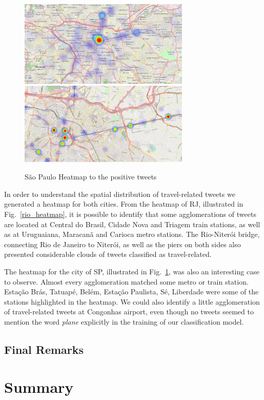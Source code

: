 \begin{figure}[h]
  \caption{São Paulo Heatmap to the positive tweets}
  \centering
    \includegraphics[width=0.725\textwidth]{figures/sp_1}
    \label{sp_heatmap}
\end{figure}

In order to understand the spatial distribution of travel-related tweets we generated a heatmap for both cities. From the heatmap of RJ, illustrated in Fig.~\ref{rio_heatmap}, it is possible to identify that some agglomerations of tweets are located at Central do Brasil, Cidade Nova and Triagem train stations, as well as at Uruguaiana, Maracanã and Carioca metro stations. The Rio-Niterói bridge, connecting Rio de Janeiro to Niterói, as well as the piers on both sides also presented considerable clouds of tweets classified as travel-related.

The heatmap for the city of SP, illustrated in Fig.~\ref{sp_heatmap}, was also an interesting case to observe. Almost every agglomeration matched some metro or train station. Estação Brás, Tatuapé, Belém, Estação Paulista, Sé, Liberdade were some of the stations highlighted in the heatmap. We could also identify a little agglomeration of travel-related tweets at Congonhas airport, even though no tweets seemed to mention the word \textit{plane} explicitly in the training of our classification model.

\subsection{Final Remarks}

\section{Summary}
